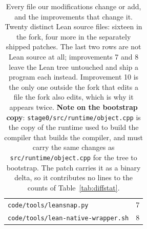 \documentclass{article}
\newcommand{\Lean}{Lean\xspace}      %
\begin{document}
\begin{table}[!ht]
\begin{tabular}{ll}
\quad \texttt{code/tools/leansnap.py} & 7 \\
\quad \texttt{code/tools/lean-native-wrapper.sh} & 8 \\
\bottomrule
\end{tabular}
\caption{Every file our modifications change or add, and the improvements that change it. Twenty distinct \Lean source files: sixteen in the fork, four more in the separately shipped patches. The last two rows are not \Lean source at all; improvements 7 and 8 leave the \Lean tree untouched and ship a program each instead. Improvement 10 is the only one outside the fork that edits a file the fork also edits, which is why it appears twice. \textbf{Note on the bootstrap copy}: \texttt{stage0/src/runtime/object.cpp} is the copy of the runtime used to build the compiler that builds the compiler, and must carry the same changes as \texttt{src/runtime/object.cpp} for the tree to bootstrap. The patch carries it as a binary delta, so it contributes no lines to the counts of Table~\ref{tab:diffstat}.}
\label{tab:file-to-improvement}
\end{table}
\end{document}
